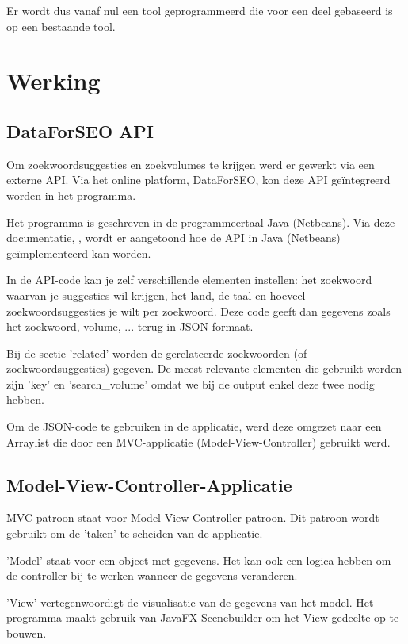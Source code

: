 Er wordt dus vanaf nul een tool geprogrammeerd die voor een deel gebaseerd is op een bestaande tool. 

\section{Werking}
\label{ch: Werking}

\subsection{DataForSEO API}
\label{ch: DataForSEO API}

Om zoekwoordsuggesties en zoekvolumes te krijgen werd er gewerkt via een externe API. Via het online platform, DataForSEO, kon deze API geïntegreerd worden in het programma. 

Het programma is geschreven in de programmeertaal Java (Netbeans). Via deze documentatie, \textcite{DATAFORSEO}, wordt er aangetoond hoe de API in Java (Netbeans) geïmplementeerd kan worden. 

In de API-code kan je zelf verschillende elementen instellen: het zoekwoord waarvan je suggesties wil krijgen, het land, de taal en hoeveel zoekwoordsuggesties je wilt per zoekwoord. Deze code geeft dan gegevens zoals het zoekwoord, volume, ... terug in JSON-formaat. 

Bij de sectie 'related' worden de gerelateerde zoekwoorden (of zoekwoordsuggesties) gegeven. De meest relevante elementen die gebruikt worden zijn 'key' en 'search\_volume' omdat we bij de output enkel deze twee nodig hebben. 

Om de JSON-code te gebruiken in de applicatie, werd deze omgezet naar een Arraylist die door een MVC-applicatie (Model-View-Controller) gebruikt werd. 

\subsection{Model-View-Controller-Applicatie}
\label{ch: Model-View-Controller-Applicatie}

MVC-patroon staat voor Model-View-Controller-patroon. Dit patroon wordt gebruikt om de 'taken' te scheiden van de applicatie. 

'Model' staat voor een object met gegevens. Het kan ook een logica hebben om de controller bij te werken wanneer de gegevens veranderen. 

'View' vertegenwoordigt de visualisatie van de gegevens van het model. Het programma maakt gebruik van JavaFX Scenebuilder om het View-gedeelte op te bouwen. 

